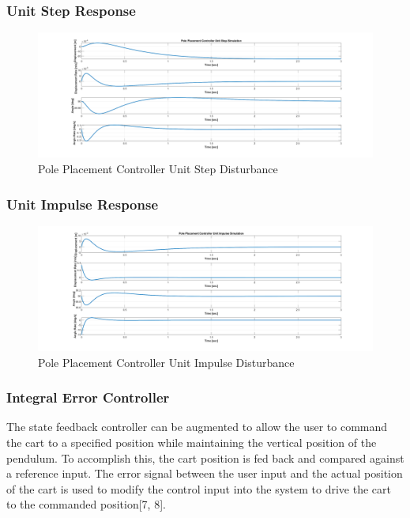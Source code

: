 \documentclass[titlepage]{article}
\begin{document}
\subsubsection{Unit Step Response}
\begin{figure}[H]
\center
\includegraphics[width=1\linewidth]{pole_placement_unit_step.png}
\caption{Pole Placement Controller Unit Step Disturbance}
\end{figure}

\subsubsection{Unit Impulse Response}
\begin{figure}[H]
\center
\includegraphics[width=1\linewidth]{pole_placement_unit_impulse.png}
\caption{Pole Placement Controller Unit Impulse Disturbance}
\end{figure}

\subsubsection{Integral Error Controller}

The state feedback controller can be augmented to allow the user to command the cart to a specified position while maintaining the vertical position of the pendulum. To accomplish this, the cart position is fed back and compared against a reference input. The error signal between the user input and the actual position of the cart is used to modify the control input into the system to drive the cart to the commanded position[7, 8].\par
\end{document}
